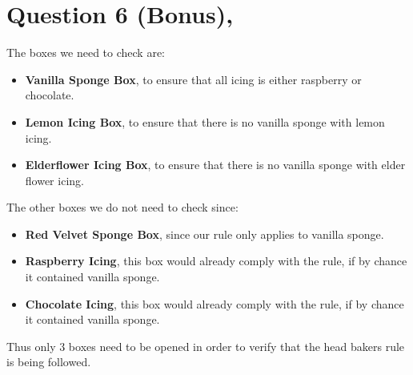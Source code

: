\documentclass{article}
\begin{document}
\section*{Question 6 (Bonus),}
The boxes we need to check are:
\begin{itemize}
    \item \textbf{Vanilla Sponge Box}, to ensure that all icing is either raspberry or chocolate.
    \item \textbf{Lemon Icing Box}, to ensure that there is no vanilla sponge with lemon icing.
    \item \textbf{Elderflower Icing Box}, to ensure that there is no vanilla sponge with elder flower icing.
\end{itemize}
The other boxes we do not need to check since:
    \begin{itemize}
        \item \textbf{Red Velvet Sponge Box}, since our rule only applies to vanilla sponge.
        \item \textbf{Raspberry Icing}, this box would already comply with the rule, if by chance it contained vanilla sponge.
        \item \textbf{Chocolate Icing}, this box would already comply with the rule, if by chance it contained vanilla sponge.
    \end{itemize}
Thus only 3 boxes need to be opened in order to verify that the head bakers rule is being followed.
\end{document}
